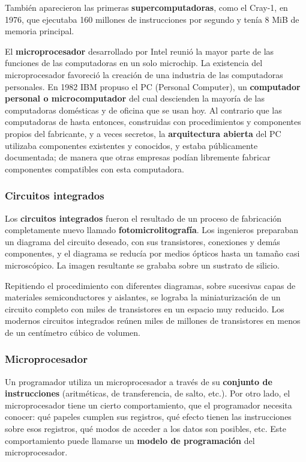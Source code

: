 \documentclass[spanish,A4,]{article}
\begin{document}
También aparecieron las primeras \textbf{supercomputadoras}, como el
Cray-1, en 1976, que ejecutaba 160 millones de instrucciones por segundo
y tenía 8 MiB de memoria principal.

El \textbf{microprocesador} desarrollado por Intel reunió la mayor parte
de las funciones de las computadoras en un solo microchip. La existencia
del microprocesador favoreció la creación de una industria de las
computadoras personales. En 1982 IBM propuso el PC (Personal Computer),
un \textbf{computador personal o microcomputador} del cual descienden la
mayoría de las computadoras domésticas y de oficina que se usan hoy. Al
contrario que las computadoras de hasta entonces, construidas con
procedimientos y componentes propios del fabricante, y a veces secretos,
la \textbf{arquitectura abierta} del PC utilizaba componentes existentes
y conocidos, y estaba públicamente documentada; de manera que otras
empresas podían libremente fabricar componentes compatibles con esta
computadora.

\subsubsection{Circuitos integrados}\label{circuitos-integrados}

Los \textbf{circuitos integrados} fueron el resultado de un proceso de
fabricación completamente nuevo llamado \textbf{fotomicrolitografía}.
Los ingenieros preparaban un diagrama del circuito deseado, con sus
transistores, conexiones y demás componentes, y el diagrama se reducía
por medios ópticos hasta un tamaño casi microscópico. La imagen
resultante se grababa sobre un sustrato de silicio.

Repitiendo el procedimiento con diferentes diagramas, sobre sucesivas
capas de materiales semiconductores y aislantes, se lograba la
miniaturización de un circuito completo con miles de transistores en un
espacio muy reducido. Los modernos circuitos integrados reúnen miles de
millones de transistores en menos de un centímetro cúbico de volumen.

\subsubsection{Microprocesador}\label{microprocesador}

Un programador utiliza un microprocesador a través de su
\textbf{conjunto de instrucciones} (aritméticas, de transferencia, de
salto, etc.). Por otro lado, el microprocesador tiene un cierto
comportamiento, que el programador necesita conocer: qué papeles cumplen
sus registros, qué efecto tienen las instrucciones sobre esos registros,
qué modos de acceder a los datos son posibles, etc. Este comportamiento
puede llamarse un \textbf{modelo de programación} del microprocesador.
\end{document}
